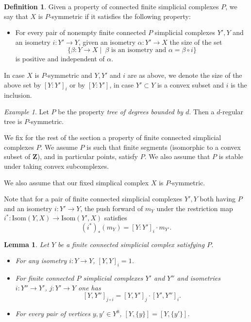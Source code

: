 \documentclass[a4paper, 11pt]{article}
\theoremstyle{plain}
\newtheorem{lemma}[proposition]{Lemma}
\theoremstyle{definition}
\newtheorem{definition}[proposition]{Definition}
\theoremstyle{remark}
\newtheorem{example}[proposition]{Example}
\newcommand{\ZZ}{\mathbf{Z}}                          %
\begin{document}
\begin{definition}
Given a property of connected finite simplicial complexes $P$,
we say that $X$ is $P$-symmetric if it satisfies the following property:
\begin{itemize}
\item
For every pair of nonempty finite connected $P$ simplicial complexes $Y',Y$ and an isometry $i:Y' \to Y$, given an isometry $\alpha:Y'\to X$ the size of the set
\[ \{\beta:Y\to X\mid~\beta \mbox{ is an isometry and } \alpha=\beta\circ i\} \]
is positive and independent of $\alpha$.
\end{itemize}
In case $X$ is $P$-symmetric and $Y,Y'$ and $i$ are as above,
we denote the size of the above set by $[Y:Y']_i$ or by $[Y:Y']$, in case $Y'\subset Y$ is a convex subset and $i$ is the inclusion.
\end{definition}

\begin{example}
Let $P$ be the property {\em tree of degrees bounded by $d$}.
Then a $d$-regular tree is $P$-symmetric.
\end{example}


We fix for the rest of the section a property of finite connected simplicial complexes $P$.
We assume $P$ is such that finite segments (isomorphic to a convex subset of $\ZZ$), and in particular points, satisfy $P$. We also assume that $P$ is stable under taking convex subcomplexes. 

We also assume that our fixed simplical complex $X$ is $P$-symmetric.

Note that for a pair of finite connected simplicial complexes $Y',Y$ both having $P$ and an isometry $i:Y' \to Y$,
the push forward of $m_Y$ under the restriction map $i^*:\text{Isom}(Y,X)\to \text{Isom}(Y',X)$ satisfies 
\begin{equation}\label{eq:i*}
(i^*)_*(m_Y)=[Y:Y']_i \cdot m_{Y'}.
\end{equation}

\begin{lemma}\label{lem:[XX']}
Let $Y$ be a finite connected simplicial complex satisfying $P$.
\begin{itemize}
\item
For any isometry $i:Y\to Y$, $[Y,Y]_i=1$.
\item 
For finite connected $P$ simplicial complexes $Y'$ and $Y''$ and isometries $i:Y''\to Y'$, $j:Y'\to Y$ one has
\[ [Y,Y'']_{j\circ i}=[Y,Y']_j\cdot [Y',Y'']_i. \]
\item
For every pair of vertices $y,y'\in Y^0$, $[Y,\{y\}]=[Y,\{y'\}]$.
\end{itemize}
\end{lemma}
\end{document}
